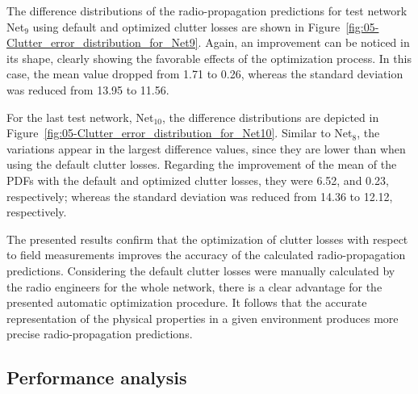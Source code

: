 The difference distributions of the radio-propagation predictions
for test network Net$_{9}$ using default and optimized clutter losses
are shown in Figure~\ref{fig:05-Clutter_error_distribution_for_Net9}.
Again, an improvement can be noticed in its shape, clearly showing
the favorable effects of the optimization process. In this case, the
mean value dropped from 1.71 to 0.26, whereas the standard deviation
was reduced from 13.95 to 11.56.

For the last test network, Net$_{10}$, the difference distributions
are depicted in Figure~\ref{fig:05-Clutter_error_distribution_for_Net10}.
Similar to Net$_{8}$, the variations appear in the largest difference
values, since they are lower than when using the default clutter losses.
Regarding the improvement of the mean of the PDFs with the default
and optimized clutter losses, they were 6.52, and 0.23, respectively;
whereas the standard deviation was reduced from 14.36 to 12.12, respectively.

The presented results confirm that the optimization of clutter losses
with respect to field measurements improves the accuracy of the calculated
radio-propagation predictions. Considering the default clutter losses
were manually calculated by the radio engineers for the whole network,
there is a clear advantage for the presented automatic optimization
procedure. It follows that the accurate representation of the physical
properties in a given environment produces more precise radio-propagation
predictions.


\subsection{Performance analysis}

